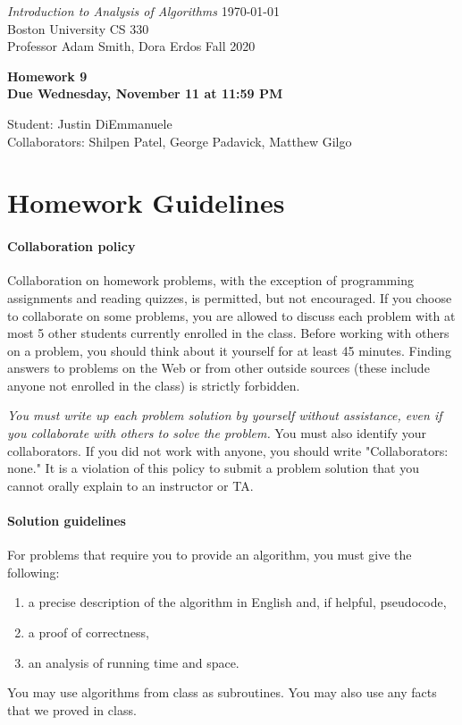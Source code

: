 \documentclass[letterpaper,11pt]{article}
\begin{document}
{\noindent\large
{\em Introduction to Analysis of Algorithms} \hfill \today\\
Boston University \hfill CS 330\\
Professor  Adam Smith, Dora Erdos \hfill Fall 2020\\}
\vspace{1pt}
\hrulefill\vspace{3mm}
\begin{center}
{\LARGE\bf Homework 9}\\
{\bf Due Wednesday, November 11 at 11:59 PM}
\end{center}


\begin{center}
    \color{teal}
   Student: Justin DiEmmanuele \\
    Collaborators: Shilpen Patel, George Padavick, Matthew Gilgo
\end{center}


\section*{Homework Guidelines}

\paragraph{Collaboration policy} Collaboration on homework problems, with the exception of
programming assignments and reading quizzes, is permitted, but not encouraged.
If you
choose to collaborate on some problems, you are allowed to discuss
each problem with at most 5 other students currently enrolled in the
class.
Before working with others on a problem, you should think about it
yourself for at least 45 minutes. Finding answers to problems on the
Web or from other outside sources (these include anyone not enrolled
in the class) is strictly forbidden.

{\em You must write up each problem solution by yourself without
assistance, even if you collaborate with others to solve the
problem.} You must also identify your collaborators. If you did not
work with anyone, you should write "Collaborators: none." It is a
violation of this policy to submit a problem solution that you
cannot orally explain to an instructor or TA.

\paragraph{Solution guidelines} For problems that require you to provide an algorithm, you must give the following:
    \begin{enumerate}
\item  a precise description of the algorithm in English and, if helpful, pseudocode,
\item a proof of correctness,
\item an analysis of running time and space.
\end{enumerate}
You may use algorithms from class as subroutines. You may also use any facts that we proved in class.
\end{document}
